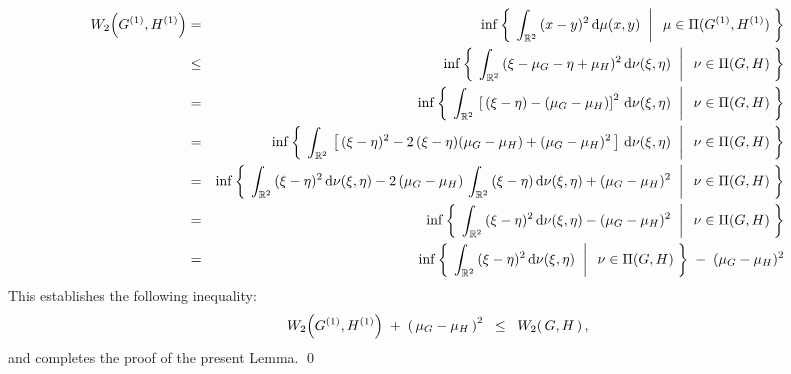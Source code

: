 \proof
\begin{eqnarray*}
W_{2}\!\left(G^{(1)},H^{(1)}\right)
&=& \inf\left\{\;\left.\int_{\mathbb{R}^{2}}\,(x - y)^{2}\,\textnormal{d}\mu(x,y)\;\;\right\vert\;\;\mu\in\Pi(G^{(1)},H^{(1)})\;\right\}
\\
&\leq& \inf\left\{\;\left.\int_{\mathbb{R}^{2}}\,(\xi - \mu_{G} - \eta + \mu_{H})^{2}\,\textnormal{d}\nu(\xi,\eta)\;\;\right\vert\;\;\nu\in\Pi(G,H)\;\right\}
\\
&=& \inf\left\{\;\left.\int_{\mathbb{R}^{2}}\,\left[\,(\xi - \eta) - (\mu_{G} - \mu_{H})\right]^{2}\,\textnormal{d}\nu(\xi,\eta)\;\;\right\vert\;\;\nu\in\Pi(G,H)\;\right\}
\\
&=& \inf\left\{\;\left.\int_{\mathbb{R}^{2}}\,\left[\,
	(\xi - \eta)^{2} - 2\,(\xi - \eta)(\mu_{G} - \mu_{H}) + (\mu_{G} - \mu_{H})^{2}
	\,\right]\,\textnormal{d}\nu(\xi,\eta)\;\;\right\vert\;\;\nu\in\Pi(G,H)\;\right\}
\\
&=& \inf\left\{\;\left.
	\int_{\mathbb{R}^{2}}\,(\xi - \eta)^{2}\,\textnormal{d}\nu(\xi,\eta)
	- 2\,(\mu_{G} - \mu_{H})\,\int_{\mathbb{R}^{2}}\,(\xi - \eta)\,\textnormal{d}\nu(\xi,\eta)
	+ (\mu_{G} - \mu_{H})^{2}
	\;\;\right\vert\;\;\nu\in\Pi(G,H)\;\right\}
\\
&=& \inf\left\{\;\left.
	\int_{\mathbb{R}^{2}}\,(\xi - \eta)^{2}\,\textnormal{d}\nu(\xi,\eta) - (\mu_{G} - \mu_{H})^{2}
	\;\;\right\vert\;\;\nu\in\Pi(G,H)\;\right\}
\\
&=& \inf\left\{\;\left.
	\int_{\mathbb{R}^{2}}\,(\xi - \eta)^{2}\,\textnormal{d}\nu(\xi,\eta)
	\;\;\right\vert\;\;\nu\in\Pi(G,H)\;\right\}
	\; - \; (\mu_{G} - \mu_{H})^{2}
\end{eqnarray*}
This establishes the following inequality:
\begin{equation*}
W_{2}\!\left(G^{(1)},H^{(1)}\right) \;+\; \left(\,\mu_{G} - \mu_{H}\,\right)^{2}
\;\; \leq \;\; W_{2}\!\left(\,G,H\,\right),
\end{equation*}
and completes the proof of the present Lemma.
\qed

